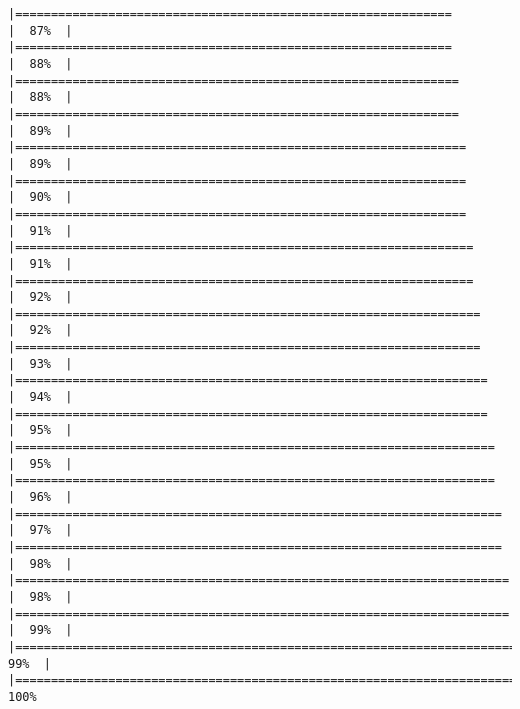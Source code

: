 \documentclass[
]{book}
\begin{document}
\begin{verbatim}
|=============================================================         |  87%  |                                                                              |=============================================================         |  88%  |                                                                              |==============================================================        |  88%  |                                                                              |==============================================================        |  89%  |                                                                              |===============================================================       |  89%  |                                                                              |===============================================================       |  90%  |                                                                              |===============================================================       |  91%  |                                                                              |================================================================      |  91%  |                                                                              |================================================================      |  92%  |                                                                              |=================================================================     |  92%  |                                                                              |=================================================================     |  93%  |                                                                              |==================================================================    |  94%  |                                                                              |==================================================================    |  95%  |                                                                              |===================================================================   |  95%  |                                                                              |===================================================================   |  96%  |                                                                              |====================================================================  |  97%  |                                                                              |====================================================================  |  98%  |                                                                              |===================================================================== |  98%  |                                                                              |===================================================================== |  99%  |                                                                              |======================================================================|  99%  |                                                                              |======================================================================| 100%
\end{verbatim}
\end{document}
